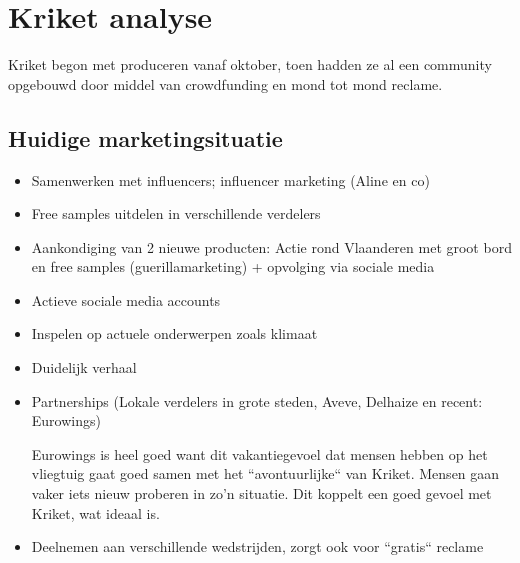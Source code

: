 
\chapter{Kriket analyse}
\label{ch:analyse}

Kriket begon met produceren vanaf oktober, toen hadden ze al een community opgebouwd door middel van crowdfunding en mond tot mond reclame.

\section{Huidige marketingsituatie}
\label{sec:huidige-marketingsituatie}
\begin{itemize} 
	\item Samenwerken met influencers; influencer marketing (Aline en co)
	\item Free samples uitdelen in verschillende verdelers
	\item Aankondiging van 2 nieuwe producten: Actie rond Vlaanderen met groot bord en free samples (guerillamarketing) + opvolging via sociale media
	\item Actieve sociale media accounts
	\item Inspelen op actuele onderwerpen zoals klimaat
	\item Duidelijk verhaal
	\item Partnerships (Lokale verdelers in grote steden, Aveve, Delhaize en recent: Eurowings)
	
	Eurowings is heel goed want dit vakantiegevoel dat mensen hebben op het vliegtuig gaat goed samen met het ``avontuurlijke`` van Kriket. Mensen gaan vaker iets nieuw proberen in zo'n situatie. Dit koppelt een goed gevoel met Kriket, wat ideaal is.
	
	\item Deelnemen aan verschillende wedstrijden, zorgt ook voor ``gratis`` reclame
\end{itemize}